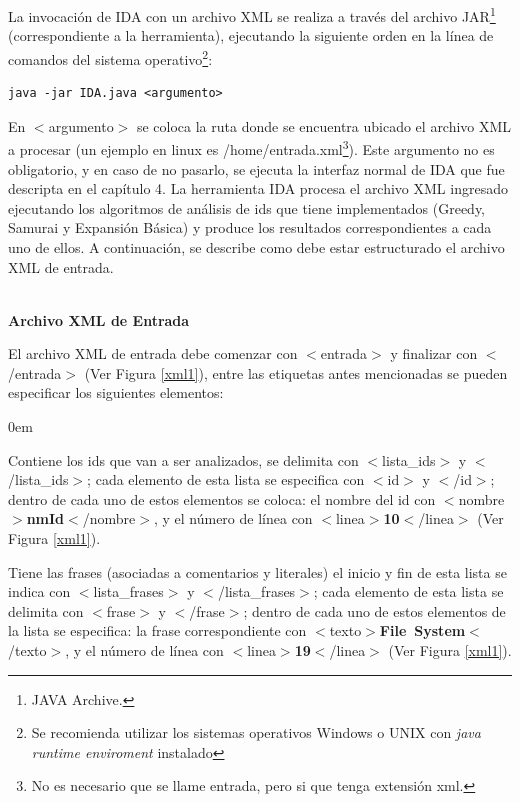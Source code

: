 \begin{appendices}
\newpage

La invocación de IDA con un archivo XML se realiza a través del archivo JAR\footnote[1]{JAVA Archive.} (correspondiente a la herramienta), ejecutando la siguiente orden en la línea de comandos del sistema operativo\footnote[2]{Se recomienda utilizar los sistemas operativos Windows o UNIX con \textit{java runtime enviroment} instalado}:


\begin{lstlisting}[style=BashInputStyle]
  java -jar IDA.java <argumento>
\end{lstlisting}


En $<$\textsf{argumento}$>$ se coloca la ruta donde se encuentra ubicado el archivo XML a procesar (un ejemplo en linux es \textsf{/home/entrada.xml}\footnote[3]{No es necesario que se llame entrada, pero si que tenga extensión xml.}). Este argumento no es obligatorio, y en caso de no pasarlo, se ejecuta la interfaz normal de IDA que fue descripta en el capítulo 4.
La herramienta IDA procesa el archivo XML ingresado ejecutando los algoritmos de análisis de ids que tiene implementados (Greedy, Samurai y Expansión Básica) y produce los resultados correspondientes a cada uno de ellos.
A continuación, se describe como debe estar estructurado el archivo XML de entrada.

\noindent \textbf{\\Archivo XML de Entrada\\} 

El archivo XML de entrada debe comenzar con \mbox{$<$\textsf{entrada}$>$} y finalizar con \mbox{$<$/\textsf{entrada}$>$} (Ver Figura \ref{xml1}), entre las etiquetas antes mencionadas se pueden especificar los siguientes elementos: 

\begin{description}
\itemsep0em%
\item[Lista de Identificadores:] Contiene los ids que van a ser analizados, se delimita con \mbox{$<$\textsf{lista\_ids}$>$} y \mbox{$<$/\textsf{lista\_ids}$>$}; cada elemento de esta lista se especifica con $<$\textsf{id}$>$ y $<$/\textsf{id}$>$; dentro de cada uno de estos elementos se coloca: el nombre del id con \mbox{$<$\textsf{nombre}$>$\textbf{nmId}$<$/\textsf{nombre}$>$}, y el número de línea con \mbox{$<$\textsf{linea}$>$\textbf{10}$<$/\textsf{linea}$>$} (Ver Figura \ref{xml1}).

\item[Lista de Frases:] Tiene las frases (asociadas a comentarios y literales) el inicio y fin de esta lista se indica con \mbox{$<$\textsf{lista\_frases}$>$} y \mbox{$<$/\textsf{lista\_frases}$>$};
cada elemento de esta lista se delimita con $<$\textsf{frase}$>$ y $<$/\textsf{frase}$>$; dentro de cada uno de estos elementos de la lista se especifica: la frase correspondiente con \mbox{$<$\textsf{texto}$>$\textbf{File System}$<$/\textsf{texto}$>$}, y el número de línea con \mbox{$<$\textsf{linea}$>$\textbf{19}$<$/\textsf{linea}$>$} (Ver Figura \ref{xml1}).


\end{description}
\end{appendices}
